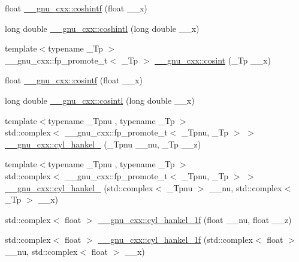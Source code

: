 \begin{DoxyCompactItemize}
\item 
float \hyperlink{group__gnu__math__spec__func_ga1af4d48209169967a836bd97e625a128}{\+\_\+\+\_\+gnu\+\_\+cxx\+::coshintf} (float \+\_\+\+\_\+x)
\item 
long double \hyperlink{group__gnu__math__spec__func_ga6d24ab53fad13d421f07d9a9a509de14}{\+\_\+\+\_\+gnu\+\_\+cxx\+::coshintl} (long double \+\_\+\+\_\+x)
\item 
{\footnotesize template$<$typename \+\_\+\+Tp $>$ }\\\+\_\+\+\_\+gnu\+\_\+cxx\+::fp\+\_\+promote\+\_\+t$<$ \+\_\+\+Tp $>$ \hyperlink{group__gnu__math__spec__func_gafd398869cde057087e6b3428a1d13a93}{\+\_\+\+\_\+gnu\+\_\+cxx\+::cosint} (\+\_\+\+Tp \+\_\+\+\_\+x)
\item 
float \hyperlink{group__gnu__math__spec__func_ga87202351dc97d2c69e42bf58f911fb5a}{\+\_\+\+\_\+gnu\+\_\+cxx\+::cosintf} (float \+\_\+\+\_\+x)
\item 
long double \hyperlink{group__gnu__math__spec__func_ga5f01f17ae8859129860118b09d51791c}{\+\_\+\+\_\+gnu\+\_\+cxx\+::cosintl} (long double \+\_\+\+\_\+x)
\item 
{\footnotesize template$<$typename \+\_\+\+Tpnu , typename \+\_\+\+Tp $>$ }\\std\+::complex$<$ \+\_\+\+\_\+gnu\+\_\+cxx\+::fp\+\_\+promote\+\_\+t$<$ \+\_\+\+Tpnu, \+\_\+\+Tp $>$ $>$ \hyperlink{group__gnu__math__spec__func_ga5329bba77d10a9d2f15d9bbe43a70db3}{\+\_\+\+\_\+gnu\+\_\+cxx\+::cyl\+\_\+hankel\+\_} (\+\_\+\+Tpnu \+\_\+\+\_\+nu, \+\_\+\+Tp \+\_\+\+\_\+z)
\item 
{\footnotesize template$<$typename \+\_\+\+Tpnu , typename \+\_\+\+Tp $>$ }\\std\+::complex$<$ \+\_\+\+\_\+gnu\+\_\+cxx\+::fp\+\_\+promote\+\_\+t$<$ \+\_\+\+Tpnu, \+\_\+\+Tp $>$ $>$ \hyperlink{group__gnu__math__spec__func_ga2f111212d3ec713625acb6986daa925f}{\+\_\+\+\_\+gnu\+\_\+cxx\+::cyl\+\_\+hankel\+\_} (std\+::complex$<$ \+\_\+\+Tpnu $>$ \+\_\+\+\_\+nu, std\+::complex$<$ \+\_\+\+Tp $>$ \+\_\+\+\_\+x)
\item 
std\+::complex$<$ float $>$ \hyperlink{group__gnu__math__spec__func_ga89758ed03e56567baa62b90cc4784f71}{\+\_\+\+\_\+gnu\+\_\+cxx\+::cyl\+\_\+hankel\+\_\+1f} (float \+\_\+\+\_\+nu, float \+\_\+\+\_\+z)
\item 
std\+::complex$<$ float $>$ \hyperlink{group__gnu__math__spec__func_ga810e021a3f11c1b2253c15c6f4d41143}{\+\_\+\+\_\+gnu\+\_\+cxx\+::cyl\+\_\+hankel\+\_\+1f} (std\+::complex$<$ float $>$ \+\_\+\+\_\+nu, std\+::complex$<$ float $>$ \+\_\+\+\_\+x)

\end{DoxyCompactItemize}
